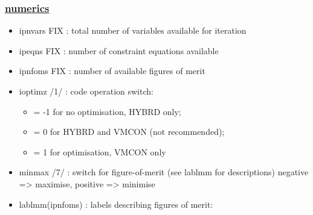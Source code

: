 \documentclass[]{article}
\providecommand{\tightlist}{%
  \setlength{\itemsep}{0pt}\setlength{\parskip}{0pt}}
\begin{document}
\subsubsection{\texorpdfstring{\href{numerics.html}{numerics}}{numerics}}\label{numerics}

\begin{itemize}
\tightlist
\item
  ipnvars FIX : total number of variables available for iteration
\item
  ipeqns FIX : number of constraint equations available
\item
  ipnfoms FIX : number of available figures of merit
\item
  ioptimz /1/ : code operation switch:

  \begin{itemize}
  \tightlist
  \item
    = -1 for no optimisation, HYBRD only;
  \item
    = 0 for HYBRD and VMCON (not recommended);
  \item
    = 1 for optimisation, VMCON only
  \end{itemize}
\item
  minmax /7/ : switch for figure-of-merit (see lablmm for descriptions)
  negative =\textgreater{} maximise, positive =\textgreater{} minimise
\item
  lablmm(ipnfoms) : labels describing figures of merit:


\end{itemize}
\end{document}
